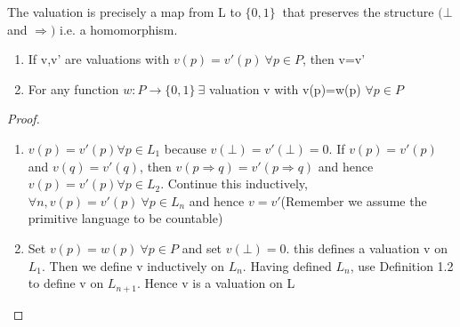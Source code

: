 The valuation is precisely a map from L to $\{0,1\}~$ that
preserves the structure $(\bot$ and $\Rightarrow)$ i.e. a homomorphism.

\begin{proposition}
\begin{enumerate}
\item If v,v' are valuations with $v(p)=v'(p)~ \forall p \in P$, then v=v'\\
\item For any function $w: P \rightarrow \{0,1\} ~ \exists$ valuation v
 with v(p)=w(p) $\forall p \in P$ \\
\end{enumerate}
\end{proposition}
\begin{proof}

\begin{enumerate}
\item $ v(p)=v'(p) \forall p \in L_1$ because $v(\bot)=v'(\bot)=0$.
If $v(p)=v'(p)$ and $v(q)=v'(q)$, then
    $v(p\Rightarrow q)=v'(p \Rightarrow q) $ and hence $ v(p)=v'(p) \forall p \in L_2$.
Continue this inductively, $\forall n, v(p)=v'(p) ~\forall p \in L_n$
and hence $v=v'$(Remember we assume the primitive language to be countable)\\
 \item Set $v(p)=w(p)~\forall p \in P$ and set $v(\bot)=0$. this defines
 a valuation v on $L_1$. Then we define v inductively on $L_n$.
 Having defined $L_n$, use Definition 1.2 to define v on $L_{n+1}$.
 Hence v is a valuation on L
 \end{enumerate}
\end{proof}

